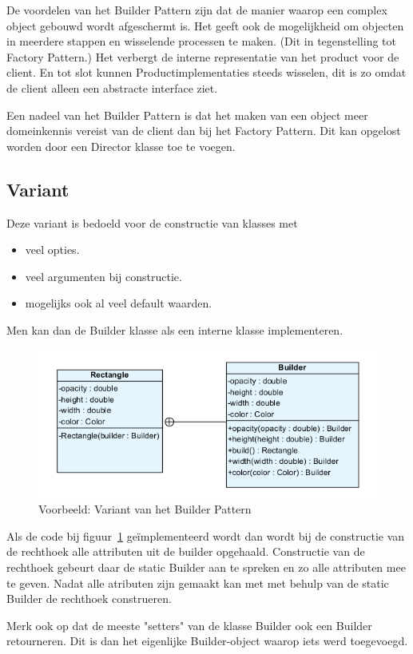 \documentclass[a4paper,12pt]{article}
\begin{document}
De voordelen van het Builder Pattern zijn dat de manier waarop een complex object gebouwd wordt afgeschermt is.
Het geeft ook de mogelijkheid om objecten in meerdere stappen en wisselende processen te maken.
(Dit in tegenstelling tot Factory Pattern.)
Het verbergt de interne representatie van het product voor de client.
En tot slot kunnen Productimplementaties steeds wisselen, dit is zo omdat de client alleen een abstracte interface ziet.

Een nadeel van het Builder Pattern is dat het maken van een object meer domeinkennis vereist van de client dan bij het Factory Pattern. Dit kan opgelost worden door een Director klasse toe te voegen.

\subsection{Variant}
Deze variant is bedoeld voor de constructie van klasses met
\begin{itemize}
\item veel opties.
\item veel argumenten bij constructie.
\item mogelijks ook al veel default waarden.
\end{itemize}
Men kan dan de Builder klasse als een interne klasse implementeren.

\begin{figure}[H]
\centering
  	\includegraphics[width=.7\linewidth]{img/Builder/BuilderVariant.png}
  	\caption{Voorbeeld: Variant van het Builder Pattern}
  	\label{fig:BuilderVariant}
\end{figure}

Als de code bij figuur~\ref{fig:BuilderVariant} geïmplementeerd wordt dan wordt bij de constructie van de rechthoek alle attributen uit de builder opgehaald.
Constructie van de rechthoek gebeurt daar de static Builder aan te spreken en zo alle attributen mee te geven.
Nadat alle atributen zijn gemaakt kan met met behulp van de static Builder de rechthoek construeren.

Merk ook op dat de meeste "setters" van de klasse Builder ook een Builder retourneren. Dit is dan het eigenlijke Builder-object waarop iets werd toegevoegd.
\end{document}
